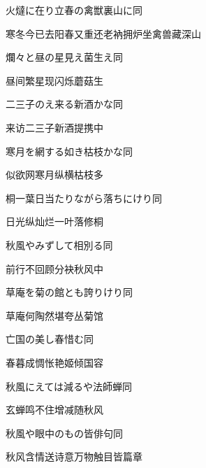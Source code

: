 \begin{haiku}
    {\FH {}火燵に在り立春の禽獣裏山に}\hfill{\FH 同}

    {\FK 寒冬今已去阳春又重还老衲拥炉坐禽兽藏深山}
\end{haiku}

\begin{haiku}
    {\FH 爛々と昼の星見え菌生え}\hfill{\FH 同}

    {\FK 昼间繁星现闪烁蘑菇生}
\end{haiku}

\begin{haiku}
    {\FH 二三子のえ来る新酒かな}\hfill{\FH 同}

    {\FK 来访二三子新酒提携中}
\end{haiku}

\begin{haiku}
    {\FH 寒月を網する如き枯枝かな}\hfill{\FH 同}

    {\FK 似欲网寒月纵横枯枝多}
\end{haiku}

\begin{haiku}
    {\FH 桐一葉日当たりながら落ちにけり}\hfill{\FH 同}

    {\FK 日光纵灿烂一叶落修桐}
\end{haiku}

\begin{haiku}
    {\FH 秋風やみずして相別る}\hfill{\FH 同}

    {\FK 前行不回顾分袂秋风中}
\end{haiku}

\begin{haiku}
    {\FH 草庵を菊の館とも誇りけり}\hfill{\FH 同}

    {\FK 草庵何陶然堪夸丛菊馆}
\end{haiku}

\begin{haiku}
    {\FH 亡国の美し春惜む}\hfill{\FH 同}

    {\FK 春暮成惆怅艳姬倾国容}
\end{haiku}

\begin{haiku}
    {\FH 秋風にえては減るや法師蝉}\hfill{\FH 同}

    {\FK 玄蝉鸣不住增减随秋风}
\end{haiku}

\begin{haiku}
    {\FH 秋風や眼中のもの皆俳句}\hfill{\FH 同}

    {\FK 秋风含情送诗意万物触目皆篇章}
\end{haiku}

